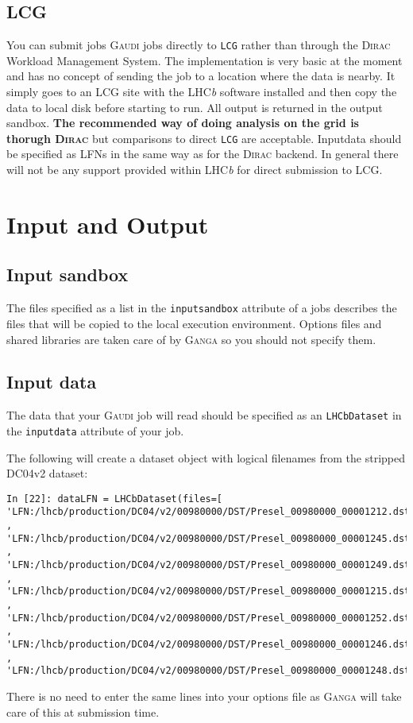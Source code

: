 \documentclass{howto}
\def\ganga {\textsc{Ganga}\xspace}
\def\lhcb {LHC{\em b\/}\xspace}
\def\gaudi {\textsc{Gaudi}\xspace}
\def\dirac {\textsc{Dirac}\xspace}
\begin{document}
\subsection{LCG}
\label{sec:lcg}
You can submit jobs \gaudi jobs directly to \texttt{LCG} rather than
through the \dirac Workload Management System. The implementation is
very basic at the moment and has no concept of sending the job to a
location where the data is nearby. It simply goes to an LCG site with
the \lhcb software installed and then copy the data to local disk
before starting to run. All output is returned in the output
sandbox. \textbf{The recommended way of doing analysis on the grid is
thorugh \dirac} but comparisons to direct \texttt{LCG} are
acceptable. Inputdata should be specified as LFNs in the same way as
for the \dirac backend. In general there will not be any support
provided within \lhcb for direct submission to LCG.


\section{Input and Output}
\label{sec:InOut}

\subsection{Input sandbox}
\label{sec:Inputsandbox}
The files specified as a list in the \texttt{inputsandbox} attribute of a jobs
describes the files that will be copied to the local execution environment.
Options files and shared libraries are taken care of by \ganga so you should
not specify them.

\subsection{Input data}
\label{sec:datasets}
The data that your \gaudi job will read should be specified as an
\texttt{LHCbDataset} in the \texttt{inputdata} attribute of your job.

The following will create a dataset object with logical filenames from the
stripped DC04v2 dataset:
\begin{verbatim}
In [22]: dataLFN = LHCbDataset(files=[
'LFN:/lhcb/production/DC04/v2/00980000/DST/Presel_00980000_00001212.dst' ,
'LFN:/lhcb/production/DC04/v2/00980000/DST/Presel_00980000_00001245.dst' ,
'LFN:/lhcb/production/DC04/v2/00980000/DST/Presel_00980000_00001249.dst' ,
'LFN:/lhcb/production/DC04/v2/00980000/DST/Presel_00980000_00001215.dst' ,
'LFN:/lhcb/production/DC04/v2/00980000/DST/Presel_00980000_00001252.dst' ,
'LFN:/lhcb/production/DC04/v2/00980000/DST/Presel_00980000_00001246.dst' ,
'LFN:/lhcb/production/DC04/v2/00980000/DST/Presel_00980000_00001248.dst'])
\end{verbatim}
There is no need to enter the same lines into your options file as \ganga will
take care of this at submission time.
\end{document}
